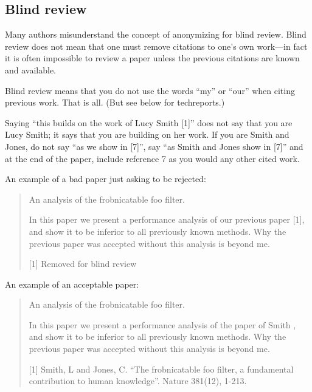 \documentclass[10pt,twocolumn,letterpaper]{article}
\begin{document}
	
	\subsection{Blind review}
	
	Many authors misunderstand the concept of anonymizing for blind
	review.  Blind review does not mean that one must remove
	citations to one's own work---in fact it is often impossible to
	review a paper unless the previous citations are known and
	available.
	
	Blind review means that you do not use the words ``my'' or ``our''
	when citing previous work.  That is all.  (But see below for
	techreports.)
	
	Saying ``this builds on the work of Lucy Smith [1]'' does not say
	that you are Lucy Smith; it says that you are building on her
	work.  If you are Smith and Jones, do not say ``as we show in
	[7]'', say ``as Smith and Jones show in [7]'' and at the end of the
	paper, include reference 7 as you would any other cited work.
	
	An example of a bad paper just asking to be rejected:
	\begin{quote}
		\begin{center}
			An analysis of the frobnicatable foo filter.
		\end{center}
		
		In this paper we present a performance analysis of our
		previous paper [1], and show it to be inferior to all
		previously known methods.  Why the previous paper was
		accepted without this analysis is beyond me.
		
		[1] Removed for blind review
	\end{quote}
	
	
	An example of an acceptable paper:
	
	\begin{quote}
		\begin{center}
			An analysis of the frobnicatable foo filter.
		\end{center}
		
		In this paper we present a performance analysis of the
		paper of Smith \etal [1], and show it to be inferior to
		all previously known methods.  Why the previous paper
		was accepted without this analysis is beyond me.
		
		[1] Smith, L and Jones, C. ``The frobnicatable foo
		filter, a fundamental contribution to human knowledge''.
		Nature 381(12), 1-213.
	\end{quote}
	
\end{document}
